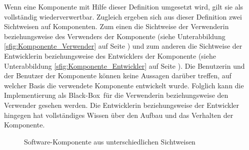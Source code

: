 Wenn eine Komponente mit Hilfe dieser Definition umgesetzt wird, gilt sie als vollständig wiederverwertbar.
Zugleich ergeben sich aus dieser Definition zwei Sichtweisen auf Komponenten. Zum einen die Sichtweise der Verwenderin beziehungsweise des Verwenders der Komponente (siehe Unterabbildung \ref{sfig:Komponente_Verwender} auf Seite \pageref{sfig:Komponente_Verwender}) und zum anderen die Sichtweise der Entwicklerin beziehungsweise des Entwicklers der Komponente (siehe Unterabbildung \ref{sfig:Komponente_Entwickler} auf Seite \pageref{sfig:Komponente_Entwickler}). Die Benutzerin und der Benutzer der Komponente können keine Aussagen darüber treffen, auf welcher Basis die verwendete Komponente entwickelt wurde. Folglich kann die Implementierung als \glqq Black-Box\grqq\ für die Verwenderin beziehungsweise den Verwender gesehen werden. Die Entwicklerin beziehungsweise der Entwickler hingegen hat vollständiges Wissen über den Aufbau und das Verhalten der Komponente.

\begin{figure}[h]
  \centering
  \qquad
  \caption[
    Software-Komponente aus unterschiedlichen Sichtweisen
  ]{
    Software-Komponente aus unterschiedlichen Sichtweisen
  }
  \label{fig:Komponente_Sichtweise}
\end{figure}

